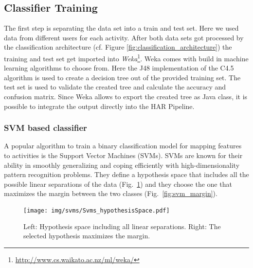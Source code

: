 \subsection{Classifier Training}\label{sec:har_classifier_training}

The first step is separating the data set into a train and test set. Here we 
used data from different users for each activity. After both data sets got 
processed by the classification architecture (cf. Figure \ref{fig:classification_architecture})
the training and test set get imported into {\it Weka}\footnote{\url{http://www.cs.waikato.ac.nz/ml/weka/}}.
Weka comes with build in machine learning algorithms to choose from. Here the 
J48 implementation of the C4.5 algorithm is used to create a decision tree out 
of the provided training set. The test set is used to validate the created tree
and calculate the accuracy and confusion matrix. Since Weka allows to export 
the created tree as Java class, it is possible to integrate the output directly 
into the HAR Pipeline.



\subsubsection*{SVM based classifier}

A popular algorithm to train a binary classification model for mapping
features to activities is the Support Vector Machines (SVMs). SVMs are
known for their ability in smoothly generalizing and coping
efficiently with high-dimensionality pattern recognition
problems. They define a hypothesis space that includes all the
possible linear separations of the data
(Fig.~\ref{fig:svm_hypothesisSpace}) and they choose the one that
maximizes the margin between the two classes
(Fig.~\ref{fig:svm_margin}).

\begin{figure}[h]
\centering
  \texttt{[image: img/svms/Svms\_hypothesisSpace.pdf]}
  \caption{Left: Hypothesis space including all linear separations. Right: The selected hypothesis maximizes the margin.}
  \label{fig:svm_hypothesisSpace}
\end{figure}


